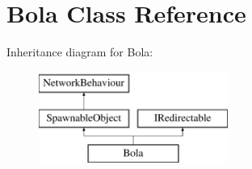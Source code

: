 \hypertarget{class_bola}{}\section{Bola Class Reference}
\label{class_bola}
Inheritance diagram for Bola\+:\begin{figure}[H]
\begin{center}
\leavevmode
\includegraphics[height=3.000000cm]{class_bola}
\end{center}
\end{figure}
